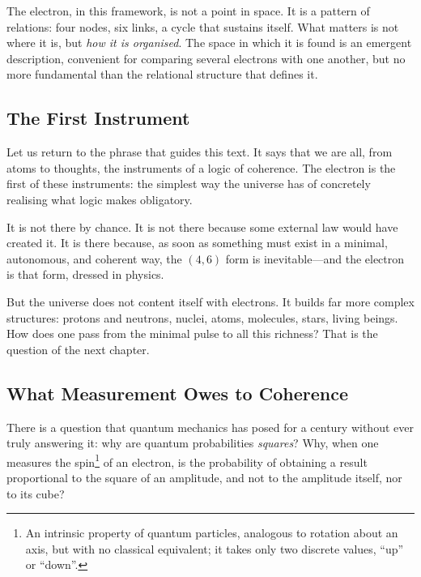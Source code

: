 \documentclass[12pt, a4paper, openright]{book}
\begin{document}
\medskip

The electron, in this framework, is not a point in space. It is a pattern of relations: four nodes, six links, a cycle that sustains itself. What matters is not where it is, but \emph{how it is organised}. The space in which it is found is an emergent description, convenient for comparing several electrons with one another, but no more fundamental than the relational structure that defines it.

\subsection*{The First Instrument}

Let us return to the phrase that guides this text. It says that we are all, from atoms to thoughts, the instruments of a logic of coherence. The electron is the first of these instruments: the simplest way the universe has of concretely realising what logic makes obligatory.

\medskip

It is not there by chance. It is not there because some external law would have created it. It is there because, as soon as something must exist in a minimal, autonomous, and coherent way, the $(4,6)$ form is inevitable---and the electron is that form, dressed in physics.

\medskip

But the universe does not content itself with electrons. It builds far more complex structures: protons and neutrons, nuclei, atoms, molecules, stars, living beings. How does one pass from the minimal pulse to all this richness? That is the question of the next chapter.

\subsection*{What Measurement Owes to Coherence}

There is a question that quantum mechanics has posed for a century without ever truly answering it: why are quantum probabilities \emph{squares}? Why, when one measures the spin\footnote{An intrinsic property of quantum particles, analogous to rotation about an axis, but with no classical equivalent; it takes only two discrete values, ``up'' or ``down''.} of an electron, is the probability of obtaining a result proportional to the square of an amplitude, and not to the amplitude itself, nor to its cube?

\medskip
\end{document}
